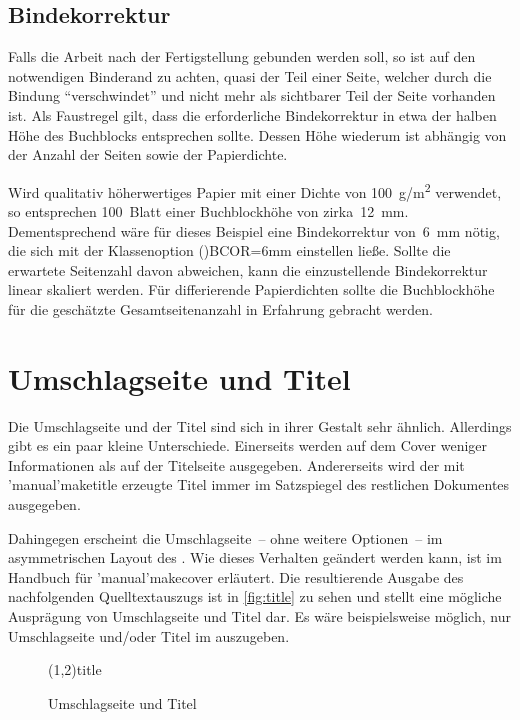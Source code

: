 \documentclass[%
  english,ngerman,%
  cdgeometry=no,DIV=12,%
  cd=false,cdfont=false,cdtitle=true,%
  headings=normal,%
  automark,%
  listof=toc,%
]{tudscrartcl}
\begin{document}
\subsection{%
  Bindekorrektur%
  \label{sec:bcor}%
}

Falls die Arbeit nach der Fertigstellung gebunden werden soll, so ist auf den 
notwendigen Binderand zu achten, quasi der Teil einer Seite, welcher durch die 
Bindung \enquote{verschwindet} und nicht mehr als sichtbarer Teil der Seite 
vorhanden ist. Als Faustregel gilt, dass die erforderliche Bindekorrektur in 
etwa der halben Höhe des Buchblocks entsprechen sollte. Dessen Höhe wiederum 
ist abhängig von der Anzahl der Seiten sowie der Papierdichte.

Wird qualitativ höherwertiges Papier mit einer Dichte von \SI{100}{g/m^2} 
verwendet, so entsprechen 100~Blatt einer Buchblockhöhe von zirka~\SI{12}{mm}. 
Dementsprechend wäre für dieses Beispiel eine Bindekorrektur von~\SI{6}{mm} 
nötig, die sich mit der Klassenoption \Option*(){BCOR=6mm} 
einstellen ließe. Sollte die erwartete Seitenzahl davon abweichen, kann die 
einzustellende Bindekorrektur linear skaliert werden. Für differierende 
Papierdichten sollte die Buchblockhöhe für die geschätzte Gesamtseitenanzahl in 
Erfahrung gebracht werden.



\section{Umschlagseite und Titel}

Die Umschlagseite und der Titel sind sich in ihrer Gestalt sehr ähnlich. 
Allerdings gibt es ein paar kleine Unterschiede. Einerseits werden auf dem 
Cover weniger Informationen als auf der Titelseite ausgegeben. Andererseits 
wird der mit \Macro'manual'{maketitle} erzeugte Titel immer im Satzspiegel des 
restlichen Dokumentes ausgegeben.

Dahingegen erscheint die Umschlagseite~-- ohne weitere Optionen~-- im 
asymmetrischen Layout des \TUDCDs. Wie dieses Verhalten geändert werden kann, 
ist im Handbuch für \Macro'manual'{makecover} erläutert. Die resultierende 
Ausgabe des nachfolgenden Quelltextauszugs ist in \autoref{fig:title} zu sehen 
und stellt eine mögliche Ausprägung von Umschlagseite und Titel dar. Es wäre 
beispielsweise möglich, nur Umschlagseite und/oder Titel im \TUDCD auszugeben. 
%
\begin{figure}
\IncludeStandalone(1,2){title}
\caption{%
  Umschlagseite und Titel%
  \label{fig:title}%
}
\end{figure}
\end{document}
